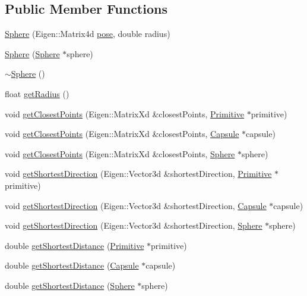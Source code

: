 \subsection*{Public Member Functions}
\begin{DoxyCompactItemize}
\item 
\hyperlink{class_sphere_a7a9a9cfc01f619bb8cda60ae907d6372}{Sphere} (Eigen\+::\+Matrix4d \hyperlink{class_primitive_ad8b2afbad412f6046783d155c88fe312}{pose}, double radius)
\item 
\hyperlink{class_sphere_a564eb09ed988535e33c2b2e701d80581}{Sphere} (\hyperlink{class_sphere}{Sphere} $\ast$sphere)
\item 
\hyperlink{class_sphere_a569c071e50a3e11f678630ee1a17737e}{$\sim$\+Sphere} ()
\item 
float \hyperlink{class_sphere_a330dd34c7c7b6dfff106c4c71ec80028}{get\+Radius} ()
\item 
void \hyperlink{class_sphere_a9290773136dacf81a9f147343a7a0486}{get\+Closest\+Points} (Eigen\+::\+Matrix\+Xd \&closest\+Points, \hyperlink{class_primitive}{Primitive} $\ast$primitive)
\item 
void \hyperlink{class_sphere_a903c1c7a459e0c048b6f36a4f1376256}{get\+Closest\+Points} (Eigen\+::\+Matrix\+Xd \&closest\+Points, \hyperlink{class_capsule}{Capsule} $\ast$capsule)
\item 
void \hyperlink{class_sphere_ac2584cb5fb1d066a9527f8c95435093b}{get\+Closest\+Points} (Eigen\+::\+Matrix\+Xd \&closest\+Points, \hyperlink{class_sphere}{Sphere} $\ast$sphere)
\item 
void \hyperlink{class_sphere_a707fc14e03a6ff67ac012a18b2a8cb28}{get\+Shortest\+Direction} (Eigen\+::\+Vector3d \&shortest\+Direction, \hyperlink{class_primitive}{Primitive} $\ast$primitive)
\item 
void \hyperlink{class_sphere_af7ff30023363261cf118d1fb80c745a7}{get\+Shortest\+Direction} (Eigen\+::\+Vector3d \&shortest\+Direction, \hyperlink{class_capsule}{Capsule} $\ast$capsule)
\item 
void \hyperlink{class_sphere_a719592bc6a8307060f49f289da631310}{get\+Shortest\+Direction} (Eigen\+::\+Vector3d \&shortest\+Direction, \hyperlink{class_sphere}{Sphere} $\ast$sphere)
\item 
double \hyperlink{class_sphere_a7330816427e4099f4a8ccb8c34bd9ec6}{get\+Shortest\+Distance} (\hyperlink{class_primitive}{Primitive} $\ast$primitive)
\item 
double \hyperlink{class_sphere_a2b078585c4b272e9286eac12189b885b}{get\+Shortest\+Distance} (\hyperlink{class_capsule}{Capsule} $\ast$capsule)
\item 
double \hyperlink{class_sphere_a6efb9b513c9b42a7b040969b802727ea}{get\+Shortest\+Distance} (\hyperlink{class_sphere}{Sphere} $\ast$sphere)
\end{DoxyCompactItemize}
